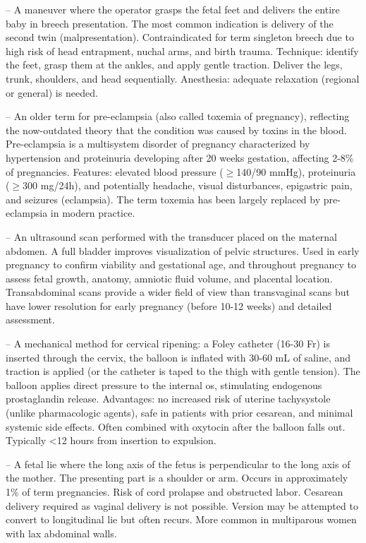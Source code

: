 -- A maneuver where the operator grasps the fetal feet and delivers the entire baby in breech presentation. The most common indication is delivery of the second twin (malpresentation). Contraindicated for term singleton breech due to high risk of head entrapment, nuchal arms, and birth trauma. Technique: identify the feet, grasp them at the ankles, and apply gentle traction. Deliver the legs, trunk, shoulders, and head sequentially. Anesthesia: adequate relaxation (regional or general) is needed.

-- An older term for pre-eclampsia (also called toxemia of pregnancy), reflecting the now-outdated theory that the condition was caused by toxins in the blood. Pre-eclampsia is a multisystem disorder of pregnancy characterized by hypertension and proteinuria developing after 20 weeks gestation, affecting 2-8\% of pregnancies. Features: elevated blood pressure (\(\ge\)140/90 mmHg), proteinuria (\(\ge\)300 mg/24h), and potentially headache, visual disturbances, epigastric pain, and seizures (eclampsia). The term toxemia has been largely replaced by pre-eclampsia in modern practice.

-- An ultrasound scan performed with the transducer placed on the maternal abdomen. A full bladder improves visualization of pelvic structures. Used in early pregnancy to confirm viability and gestational age, and throughout pregnancy to assess fetal growth, anatomy, amniotic fluid volume, and placental location. Transabdominal scans provide a wider field of view than transvaginal scans but have lower resolution for early pregnancy (before 10-12 weeks) and detailed assessment.

-- A mechanical method for cervical ripening: a Foley catheter (16-30 Fr) is inserted through the cervix, the balloon is inflated with 30-60 mL of saline, and traction is applied (or the catheter is taped to the thigh with gentle tension). The balloon applies direct pressure to the internal os, stimulating endogenous prostaglandin release. Advantages: no increased risk of uterine tachysystole (unlike pharmacologic agents), safe in patients with prior cesarean, and minimal systemic side effects. Often combined with oxytocin after the balloon falls out. Typically <12 hours from insertion to expulsion.

-- A fetal lie where the long axis of the fetus is perpendicular to the long axis of the mother. The presenting part is a shoulder or arm. Occurs in approximately 1\% of term pregnancies. Risk of cord prolapse and obstructed labor. Cesarean delivery required as vaginal delivery is not possible. Version may be attempted to convert to longitudinal lie but often recurs. More common in multiparous women with lax abdominal walls.


